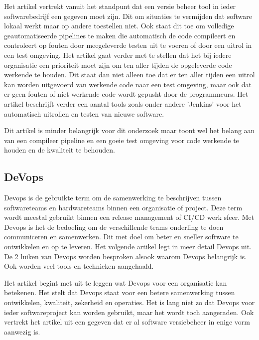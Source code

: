 Het artikel \autocite{Meyer2014} vertrekt vanuit het standpunt dat een versie beheer tool in ieder softwarebedrijf een gegeven moet zijn. Dit om situaties te vermijden dat software lokaal werkt maar op andere toestellen niet. Ook staat dit toe om volledige geautomatiseerde pipelines te maken die automatisch de code compileert en controleert op fouten door meegeleverde testen uit te voeren of door een uitrol in een test omgeving. Het artikel gaat verder met te stellen dat het bij iedere organisatie een prioriteit moet zijn om ten aller tijden de opgeleverde code werkende te houden. Dit staat dan niet alleen toe dat er ten aller tijden een uitrol kan worden uitgevoerd van werkende code naar een test omgeving, maar ook dat er geen fouten of niet werkende code wordt gepusht door de programmeurs. Het artikel beschrijft verder een aantal tools zoals onder andere 'Jenkins' voor het automatisch uitrollen en testen van nieuwe software.

Dit artikel \autocite{Meyer2014} is minder belangrijk voor dit onderzoek maar toont wel het belang aan van een compileer pipeline en een goeie test omgeving voor code werkende te houden en de kwaliteit te behouden.

\subsection{DeVops}
Devops is de gebruikte term om de samenwerking te beschrijven tussen softwareteams en hardwareteams binnen een organisatie of project. Deze term wordt meestal gebruikt binnen een release management of CI/CD werk sfeer. Met Devops is het de bedoeling om de verschillende teams onderling te doen communiceren en samenwerken. Dit met doel om beter en sneller software te ontwikkelen en op te leveren. Het volgende artikel \autocite{Ebert2016} legt in meer detail Devops uit. De 2 luiken van Devops worden besproken alsook waarom Devops belangrijk is. Ook worden veel tools en technieken aangehaald.

Het artikel \autocite{Ebert2016} begint met uit te leggen wat Devops voor een organisatie kan betekenen. Het stelt dat Devops staat voor een betere samenwerking tussen ontwikkelen, kwaliteit, zekerheid en operaties. Het is lang niet zo dat Devops voor ieder softwareproject kan worden gebruikt, maar het wordt toch aangeraden. Ook vertrekt het artikel uit een gegeven dat er al software versiebeheer in enige vorm aanwezig is.

